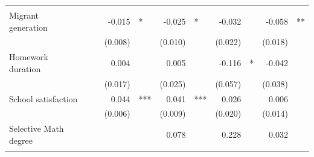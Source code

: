 \documentclass{article}
\begin{document}
\begin{table}[!h]
\begin{tabular}{lllllllllll}
  \multicolumn{1}{l}{} \\
\multicolumn{1}{l}{Migrant generation} &
  \multicolumn{1}{r}{} &
  \multicolumn{1}{l}{} &
  \multicolumn{1}{r}{-0.015} &
  \multicolumn{1}{l}{*} &
  \multicolumn{1}{r}{-0.025} &
  \multicolumn{1}{l}{*} &
  \multicolumn{1}{r}{-0.032} &
  \multicolumn{1}{l}{} &
  \multicolumn{1}{r}{-0.058} &
  \multicolumn{1}{l}{**} \\
\multicolumn{1}{l}{} &
  \multicolumn{1}{r}{} &
  \multicolumn{1}{l}{} &
  \multicolumn{1}{r}{(0.008)} &
  \multicolumn{1}{l}{} &
  \multicolumn{1}{r}{(0.010)} &
  \multicolumn{1}{l}{} &
  \multicolumn{1}{r}{(0.022)} &
  \multicolumn{1}{l}{} &
  \multicolumn{1}{r}{(0.018)} &
  \multicolumn{1}{l}{} \\
\multicolumn{1}{l}{Homework duration} &
  \multicolumn{1}{r}{} &
  \multicolumn{1}{l}{} &
  \multicolumn{1}{r}{0.004} &
  \multicolumn{1}{l}{} &
  \multicolumn{1}{r}{0.005} &
  \multicolumn{1}{l}{} &
  \multicolumn{1}{r}{-0.116} &
  \multicolumn{1}{l}{*} &
  \multicolumn{1}{r}{-0.042} &
  \multicolumn{1}{l}{} \\
\multicolumn{1}{l}{} &
  \multicolumn{1}{r}{} &
  \multicolumn{1}{l}{} &
  \multicolumn{1}{r}{(0.017)} &
  \multicolumn{1}{l}{} &
  \multicolumn{1}{r}{(0.025)} &
  \multicolumn{1}{l}{} &
  \multicolumn{1}{r}{(0.057)} &
  \multicolumn{1}{l}{} &
  \multicolumn{1}{r}{(0.038)} &
  \multicolumn{1}{l}{} \\
\multicolumn{1}{l}{School satisfaction} &
  \multicolumn{1}{r}{} &
  \multicolumn{1}{l}{} &
  \multicolumn{1}{r}{0.044} &
  \multicolumn{1}{l}{***} &
  \multicolumn{1}{r}{0.041} &
  \multicolumn{1}{l}{***} &
  \multicolumn{1}{r}{0.026} &
  \multicolumn{1}{l}{} &
  \multicolumn{1}{r}{0.006} &
  \multicolumn{1}{l}{} \\
\multicolumn{1}{l}{} &
  \multicolumn{1}{r}{} &
  \multicolumn{1}{l}{} &
  \multicolumn{1}{r}{(0.006)} &
  \multicolumn{1}{l}{} &
  \multicolumn{1}{r}{(0.009)} &
  \multicolumn{1}{l}{} &
  \multicolumn{1}{r}{(0.020)} &
  \multicolumn{1}{l}{} &
  \multicolumn{1}{r}{(0.014)} &
  \multicolumn{1}{l}{} \\
\multicolumn{1}{l}{Selective Math degree} &
  \multicolumn{1}{r}{} &
  \multicolumn{1}{l}{} &
  \multicolumn{1}{r}{} &
  \multicolumn{1}{l}{} &
  \multicolumn{1}{r}{0.078} &
  \multicolumn{1}{l}{} &
  \multicolumn{1}{r}{0.228} &
  \multicolumn{1}{l}{} &
  \multicolumn{1}{r}{0.032} &
  \multicolumn{1}{l}{} \\
\multicolumn{1}{l}{} &
  \multicolumn{1}{r}{} &
  \multicolumn{1}{l}{} &
  \multicolumn{1}{r}{} &

\end{tabular}
\end{table}
\end{document}
